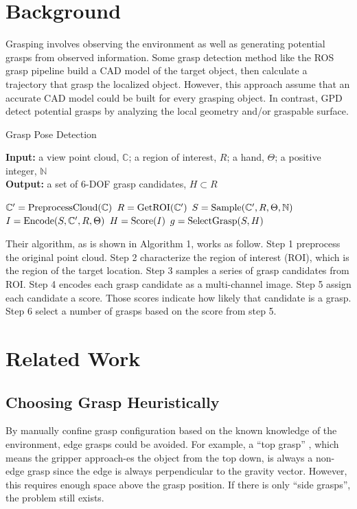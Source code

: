 \documentclass[letterpaper]{article} %
\begin{document}
\section{Background}
\noindent Grasping involves observing the environment as well as generating potential grasps from observed information. Some grasp detection method like the ROS grasp pipeline \cite{RN5} build a CAD model of the target object, then calculate a trajectory that grasp the localized object. However, this approach assume that an accurate CAD model could be built for every grasping object. In contrast, GPD \cite{RN6} detect potential grasps by analyzing the local geometry and/or graspable surface.

\begin{algorithm}
\caption{Grasp Pose Detection}
\textbf{Input:} a view point cloud,  $\mathbb{C}$; a region of interest, $R$; a hand, $\Theta$; a positive integer, $\mathbb{N}$ \\
\textbf{Output:} a set of 6-DOF grasp candidates, $H\subset R$ \\
\begin{algorithmic}[1]
\STATE $\mathbb{C}'={\rm PreprocessCloud}(\mathbb{C})$
\STATE $R={\rm GetROI}(\mathbb{C}')$
\STATE $S={\rm Sample}(\mathbb{C}',R,\Theta, \mathbb{N})$
\STATE $I={\rm Encode}(S,\mathbb{C}', R, \Theta)$
\STATE $H={\rm Score}(I)$
\STATE $g={\rm SelectGrasp}(S, H)$
\end{algorithmic}  
\end{algorithm}  

Their algorithm, as is shown in Algorithm 1, works as follow. Step 1 preprocess the original point cloud. Step 2 characterize the region of interest (ROI), which is the region of the target location. Step 3 samples a series of grasp candidates from ROI. Step 4 encodes each grasp candidate as a multi-channel image. Step 5 assign each candidate a score. Those scores indicate how likely that candidate is a grasp. Step 6 select a number of grasps based on the score from step 5.

\section{Related Work}
\subsection{Choosing Grasp Heuristically}
By manually confine grasp configuration based on the known knowledge of the environment, edge grasps could be avoided. For example, a “top grasp” \cite{RN8}, which means the gripper approach-es the object from the top down, is always a non-edge grasp since the edge is always perpendicular to the gravity vector. However, this requires enough space above the grasp position. If there is only “side grasps”, the problem still exists.
\end{document}
